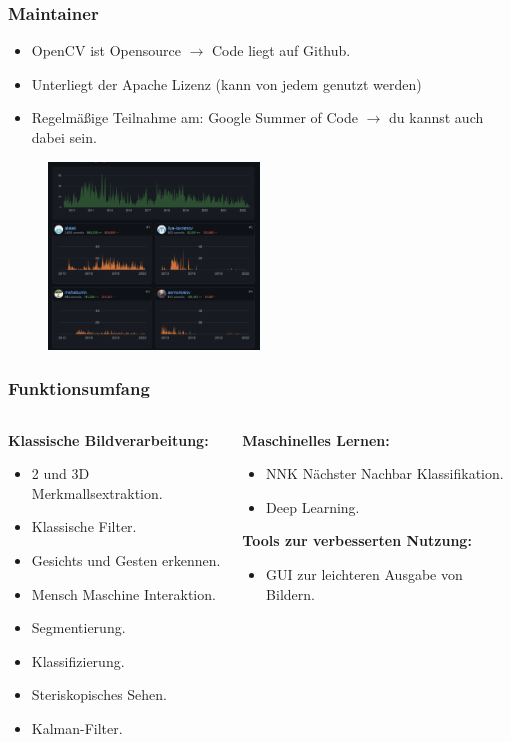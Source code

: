 \documentclass{beamer}
\begin{document}
\begin{frame} \frametitle{Maintainer}
		\begin{itemize}
\item OpenCV ist Opensource $\rightarrow$ Code liegt auf Github.\\
\item Unterliegt der Apache Lizenz (kann von jedem genutzt werden)\\
\item Regelmäßige Teilnahme am: Google Summer of Code $\rightarrow$ du kannst auch dabei sein.
	\end{itemize}
\begin{figure}
	\centering
	\includegraphics[width=0.5\textwidth]{Bilder/maintainer.png}
	\label{a5}
\end{figure}
\cite{GitHub, Bradski2008}
\end{frame}


\begin{frame} \frametitle{Funktionsumfang}
\begin{columns}
	\begin{column}{0.5\textwidth}
	\textbf{Klassische Bildverarbeitung: }
	\begin{itemize}
		\item  2 und 3D Merkmallsextraktion.
		\item Klassische Filter.
		\item Gesichts und Gesten erkennen.
		\item Mensch Maschine Interaktion.
		\item Segmentierung.
		\item Klassifizierung.
		\item Steriskopisches Sehen.
		\item Kalman-Filter.
	\end{itemize}
\end{column}
\begin{column}{0.5\textwidth}
	\textbf{Maschinelles Lernen:}
	\begin{itemize}
		\item NNK Nächster Nachbar Klassifikation.
		\item Deep Learning.
	\end{itemize}
\textbf{Tools zur verbesserten Nutzung:}
\begin{itemize}
	\item GUI zur leichteren Ausgabe von Bildern.
\end{itemize}
	\end{column}
\end{columns}	
	\cite{Bradski2008}
\end{frame}
\end{document}

